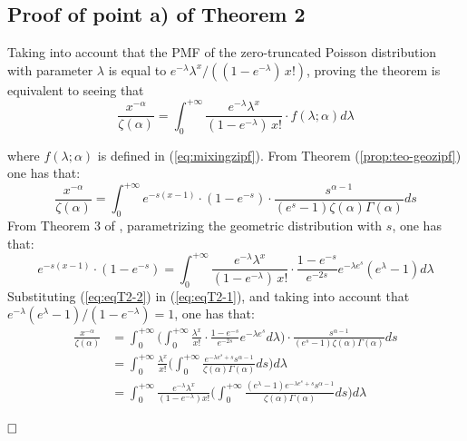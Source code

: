 \documentclass{article}
\begin{document}
\begin{appendices}
\subsection{Proof of point a) of  Theorem 2}
Taking into account that the PMF of the zero-truncated Poisson distribution with parameter $\lambda$ is equal to $e^{-\lambda} \lambda^x/((1-e^{-\lambda})\, x!)$,  proving the theorem is equivalent to seeing that
\begin{equation} \label{eq:altproofT2}
    \frac{x^{-\alpha}}{\zeta(\alpha)}=\int_0^{+\infty} \frac{e^{-\lambda} \lambda^x}{(1-e^{-\lambda})\, x!} \cdot f(\lambda; \alpha) d \lambda
\end{equation}

where $f(\lambda;\alpha)$ is defined in (\ref{eq:mixingzipf}). From Theorem (\ref{prop:teo-geozipf}) one has that:
\begin{equation} \label{eq:eqT2-1}
\frac{x^{-\alpha}}{\zeta(\alpha)}=\int_0^{+\infty} e^{-s (x-1)} \cdot (1-e^{-s}) \cdot \frac{s^{\alpha-1}}{(e^s-1) \zeta(\alpha) \Gamma(\alpha)} ds
\end{equation}
From Theorem 3 of \cite{valero2022zipf},  parametrizing  the geometric distribution with $s$, one has that:
\begin{equation} \label{eq:eqT2-2}
e^{-s (x-1)} \cdot (1-e^{-s})= \int_0^{+\infty} \frac{e^{-\lambda} \lambda^x}{(1-e^{-\lambda})\, x!} \cdot \frac{1-e^{-s}}{e^{-2 s}} e^{-\lambda e^s} (e^{\lambda}-1) d \lambda
\end{equation}
Substituting (\ref{eq:eqT2-2}) in (\ref{eq:eqT2-1}), and  taking into account that $e^{-\lambda} (e^{\lambda}-1)/(1-e^{-\lambda})=1$, one has that:
\begin{align*}
    \frac{x^{-\alpha}}{\zeta(\alpha)} & =  \int_0^{+\infty} \Big(   \int_0^{+\infty} \frac{ \lambda^x}{ x!} \cdot \frac{1-e^{-s}}{e^{-2 s}} e^{-\lambda e^s}  d \lambda    \Big) \cdot \frac{s^{\alpha-1}}{(e^s-1) \zeta(\alpha) \Gamma(\alpha)} ds \\ &=  \int_0^{+\infty} \frac{\lambda^x}{x!} \Big(\int_0^{+\infty} \frac{e^{-\lambda e^s+s} s^{\alpha-1}}{ \zeta(\alpha) \Gamma(\alpha)  } ds \Big) d \lambda \nonumber \\
&=   \int_0^{+\infty} \frac{ e^{-\lambda} \lambda^x}{(1-e^{-\lambda}) x!} \Big(\int_0^{+\infty} \frac{ (e^{\lambda}-1) e^{-\lambda e^s+s} s^{\alpha-1}}{ \zeta(\alpha) \Gamma(\alpha)  } ds \Big) d \lambda 
\end{align*}  

$\hfill{\square}$



\end{appendices}
\end{document}
